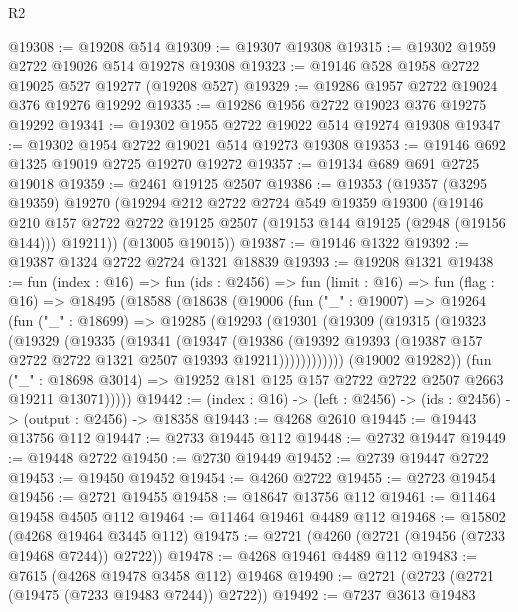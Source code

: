 \begin{lexlean}{R2}
\begin{coremodule}
@19308 := @19208 @514
@19309 := @19307 @19308
@19315 := @19302 @1959 @2722 @19026 @514 @19278 @19308
@19323 := @19146 @528 @1958 @2722 @19025 @527 @19277 (@19208 @527)
@19329 := @19286 @1957 @2722 @19024 @376 @19276 @19292
@19335 := @19286 @1956 @2722 @19023 @376 @19275 @19292
@19341 := @19302 @1955 @2722 @19022 @514 @19274 @19308
@19347 := @19302 @1954 @2722 @19021 @514 @19273 @19308
@19353 := @19146 @692 @1325 @19019 @2725 @19270 @19272
@19357 := @19134 @689 @691 @2725 @19018
@19359 := @2461 @19125 @2507
@19386 := @19353
    (@19357
      (@3295 @19359)
      @19270
      (@19294
        @212
        @2722
        @2724
        @549
        @19359
        @19300
        (@19146
          @210
          @157
          @2722
          @2722
          @19125
          @2507
          (@19153 @144 @19125 (@2948 (@19156 @144)))
          @19211))
      (@13005 @19015))
@19387 := @19146 @1322
@19392 := @19387 @1324 @2722 @2724 @1321 @18839
@19393 := @19208 @1321
@19438 := fun (index : @16) =>
  fun (ids : @2456) =>
  fun (limit : @16) =>
  fun (flag : @16) =>
  @18495
    (@18588
      (@18638
        (@19006
          (fun ("_" : @19007) =>
          @19264
            (fun ("_" : @18699) =>
            @19285
              (@19293
                (@19301
                  (@19309
                    (@19315
                      (@19323
                        (@19329
                          (@19335
                            (@19341
                              (@19347
                                (@19386
                                  (@19392
                                    @19393
                                    (@19387 @157 @2722 @2722 @1321 @2507 @19393 @19211))))))))))))
              (@19002 @19282))
            (fun ("_" : @18698 @3014) =>
            @19252 @181 @125 @157 @2722 @2722 @2507 @2663 @19211 @13071)))))
@19442 := (index : @16) -> (left : @2456) -> (ids : @2456) -> (output : @2456) -> @18358
@19443 := @4268 @2610
@19445 := @19443 @13756 @112
@19447 := @2733 @19445 @112
@19448 := @2732 @19447
@19449 := @19448 @2722
@19450 := @2730 @19449
@19452 := @2739 @19447 @2722
@19453 := @19450 @19452
@19454 := @4260 @2722
@19455 := @2723 @19454
@19456 := @2721 @19455
@19458 := @18647 @13756 @112
@19461 := @11464 @19458 @4505 @112
@19464 := @11464 @19461 @4489 @112
@19468 := @15802 (@4268 @19464 @3445 @112)
@19475 := @2721 (@4260 (@2721 (@19456 (@7233 @19468 @7244)) @2722))
@19478 := @4268 @19461 @4489 @112
@19483 := @7615 (@4268 @19478 @3458 @112) @19468
@19490 := @2721 (@2723 (@2721 (@19475 (@7233 @19483 @7244)) @2722))
@19492 := @7237 @3613 @19483

\end{coremodule}
\end{lexlean}
